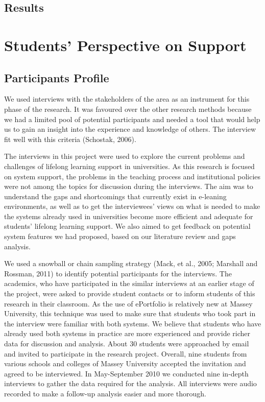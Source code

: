 \subsection{Results}

\section{Students' Perspective on \LLLc Support}
\subsection{Participants Profile}
We used interviews with the stakeholders of the area as an instrument for this
phase of the research. It was favoured over the other research methods because
we had a limited pool of potential participants and needed a tool that would
help us to gain an insight into the experience and knowledge of others. The
interview fit well with this criteria (Schostak, 2006). 

The interviews in this
project were used to explore the current problems and challenges of lifelong
learning support in universities. As this research is focused on system support,
the problems in the teaching process and institutional policies were not among
the topics for discussion during the interviews. The aim was to understand the
gaps and shortcomings that currently exist in e-leaning environments, as well as
to get the interviewees' views on what is needed to make the systems already
used in universities become more efficient and adequate for students’ lifelong
learning support. We also aimed to get feedback on potential system features we
had proposed, based on our literature review and gaps analysis. 

We used a
snowball or chain sampling strategy (Mack, et al., 2005; Marshall and Rossman,
2011) to identify potential participants for the interviews. The academics, who
have participated in the similar interviews at an earlier stage of the project,
were asked to provide student contacts or to inform students of this research in
their classroom. As the use of ePortfolio is relatively new at Massey
University, this technique was used to make sure that students who took part in
the interview were familiar with both systems. We believe that students who have
already used both systems in practice are more experienced and provide richer
data for discussion and analysis. About 30 students were approached by email and
invited to participate in the research project. Overall, nine students from
various schools and colleges of Massey University accepted the invitation and
agreed to be interviewed. In May-September 2010 we conducted nine in-depth
interviews to gather the data required for the analysis. All interviews were
audio recorded to make a follow-up analysis easier and more thorough.

